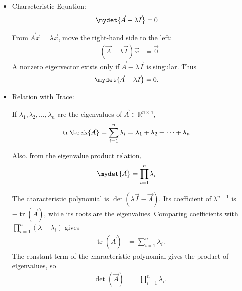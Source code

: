 \begin{enumerate}[label=\thesubsection.\arabic*, ref=\thesubsection.\theenumi,itemsep=0pt]
\begin{itemize}
For a square matrix $\vec{A}$,
\begin{align}
\vec{A}\vec{x}
&= \lambda\vec{x}, \qquad \vec{x}\ne\vec{0}
\label{eq:eigen_definition}
\end{align}
where $\lambda$ is an eigenvalue and $\vec{x}$ is the corresponding eigenvector.


\solution
An eigenvector is a nonzero vector whose direction is unchanged by multiplication by the matrix; the scalar factor is its eigenvalue. Rearranging the defining equation gives
\begin{align}
(\vec{A}-\lambda\vec{I})\vec{x}&=\vec{0}.
\end{align}
For a nonzero solution $\vec{x}$ to exist, the matrix must be singular. Therefore its determinant must vanish, which gives the characteristic equation in the next subsection.
\item Characteristic Equation:
\begin{align}
\mydet{\vec{A}-\lambda\vec{I}}
&= 0
\label{eq:characteristic_equation}
\end{align}


\solution
From $\vec{A}\vec{x}=\lambda\vec{x}$, move the right-hand side to the left:
\begin{align}
(\vec{A}-\lambda\vec{I})\vec{x}&=\vec{0}.
\end{align}
A nonzero eigenvector exists only if $\vec{A}-\lambda\vec{I}$ is singular. Thus
\begin{align}
\mydet{\vec{A}-\lambda\vec{I}}&=0.
\end{align}
\item Relation with Trace:

If $\lambda_1,\lambda_2,\ldots,\lambda_n$ are the eigenvalues of $\vec{A}\in\mathbb{R}^{n\times n}$,
\begin{align}
\operatorname{tr}\brak{\vec{A}}
&= \sum_{i=1}^{n}\lambda_i
= \lambda_1+\lambda_2+\cdots+\lambda_n
\label{eq:eigen_trace}
\end{align}

Also, from the eigenvalue product relation,
\begin{align}
\mydet{\vec{A}}
&= \prod_{i=1}^{n}\lambda_i
\label{eq:eigen_determinant}
\end{align}

\solution
The characteristic polynomial is $\det(\lambda\vec{I}-\vec{A})$. Its coefficient of $\lambda^{n-1}$ is $-\operatorname{tr}(\vec{A})$, while its roots are the eigenvalues. Comparing coefficients with $\prod_{i=1}^{n}(\lambda-\lambda_i)$ gives
\begin{align}
\operatorname{tr}(\vec{A})&=\sum_{i=1}^{n}\lambda_i.
\end{align}
The constant term of the characteristic polynomial gives the product of eigenvalues, so
\begin{align}
\det(\vec{A})&=\prod_{i=1}^{n}\lambda_i.
\end{align}
\end{itemize}


\end{enumerate}
